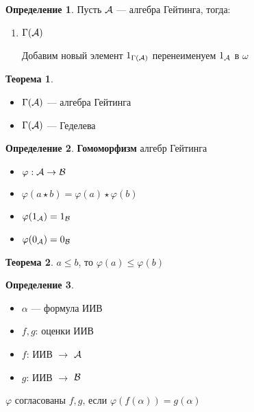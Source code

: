 \documentclass[english]{article}
\theoremstyle{plain}
\theoremstyle{remark}
\theoremstyle{definition}
\newtheorem{theorem}{Теорема}[section]
\newtheorem*{definition}{Определение}
\begin{document}
\begin{definition}
Пусть \(\mathcal{A}\) --- алгебра Гейтинга, тогда:
\begin{enumerate}
\item \(\Gamma(\mathcal{A})\) \\
\begin{center}
\end{center}

Добавим новый элемент \(1_{\Gamma(\mathcal{A})}\) перенеименуем \(1_{\mathcal{A}}\) в  \(\omega\)
\end{enumerate}
\end{definition}
\begin{theorem}
\-
\begin{itemize}
\item \(\Gamma(\mathcal{A})\) --- алгебра Гейтинга
\item \(\Gamma(\mathcal{A})\) --- Геделева
\end{itemize}
\end{theorem}
\begin{definition}
\textbf{Гомоморфизм} алгебр Гейтинга \\
\begin{itemize}
\item \(\varphi: \mathcal{A} \to \mathcal{B}\)
\item \(\varphi(a \star b) = \varphi(a)\star\varphi(b)\)
\item \(\varphi(1_{\mathcal{A}}) = 1_{\mathcal{B}}\)
\item \(\varphi(0_{\mathcal{A}}) = 0_{\mathcal{B}}\)
\end{itemize}
\end{definition}
\begin{theorem}
\(a \le b\), то \(\varphi(a) \le \varphi(b)\)
\end{theorem}
\begin{definition}
\-
\begin{itemize}
\item \(\alpha\) --- формула ИИВ
\item \(f, g\): оценки ИИВ
\item \(f\): ИИВ \(\to\) \(\mathcal{A}\)
\item \(g\): ИИВ \(\to\) \(\mathcal{B}\)
\end{itemize}
\(\varphi\) согласованы \(f, g\), если \(\varphi(f(\alpha)) = g(\alpha)\)
\end{definition}
\end{document}
